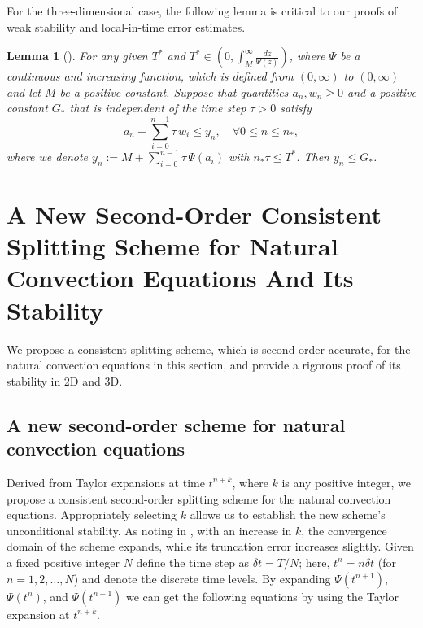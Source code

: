 \documentclass[10pt]{article}
\newtheorem{lemma}{Lemma}[section]
\begin{document}
	For the three-dimensional case, the following lemma is critical to our proofs of weak stability and local-in-time error estimates.
	\begin{lemma}[\cite{J2010}]\label{Lem2.5}
		{\it For any given  \(T^*\) and $T^*\in(0,\int_{M}^{\infty} \frac{dz}{\Psi(z)})$, where $\Psi$  be a continuous and increasing function, which is defined from $(0, \infty) $ to $ (0, \infty)$ and let \(M \) be a positive constant.  
			Suppose that quantities \(a_n, w_n \geq 0\) and a positive constant  \(G_* \) that is independent of the time step  \(\tau > 0\) satisfy 
			\[
			a_n + \sum_{i = 0}^{n - 1} \tau \, w_i \leq y_n , \quad\forall 0\leq n \leq n_*,
			\]
			where we denote $y_n := M + \sum_{i = 0}^{n - 1} \tau \, \Psi(a_i)$
			with \(n_* \tau \leq T^*\). Then \(y_n \leq G_*\).} 
	\end{lemma}
	
	\section{A New Second-Order Consistent Splitting Scheme for Natural Convection Equations And Its Stability}
	\setcounter{equation}{0}
	We propose a consistent splitting scheme, which is second-order accurate, for the natural convection equations in this section, and provide a rigorous proof of its  stability in 2D and  3D.
	
	\subsection{A new second-order scheme for natural convection equations}
	
Derived from Taylor expansions at time $ t^
{n+k}$, where $k$ is any positive integer, we propose a consistent second-order splitting scheme for the natural convection equations. Appropriately selecting \( k \) allows us to establish the new scheme's unconditional stability. As noting in \cite{Shen2023}, with an increase in \( k \), the convergence domain of the scheme expands, while its truncation error increases slightly. Given a fixed positive integer \( N \) define the time step as \( \delta t = T/N \); here, \( t^n = n\delta t \) (for \( n = 1, 2, \dots, N \)) and denote the discrete time levels. By expanding \( \varPsi(t^{n+1}) \), \( \varPsi(t^n) \), and \( \varPsi(t^{n-1}) \) we can get the following equations by using the Taylor expansion at \( t^{n+k} \).
	
\end{document}

